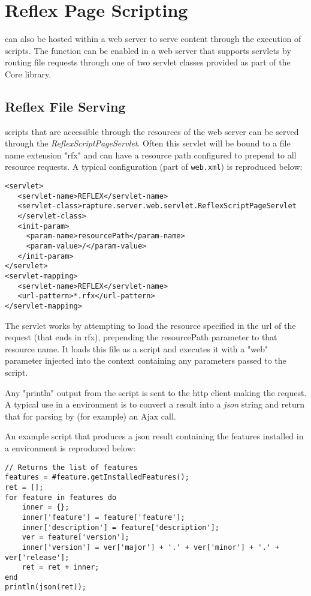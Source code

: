 \chapter{Reflex Page Scripting}
\Reflex can also be hosted within a web server to serve content through the execution of \Reflex scripts. The function can be enabled in a web server that supports servlets by routing file requests through one of two servlet classes provided as part of the \Rapture Core library.

\section{Reflex File Serving}
\Reflex scripts that are accessible through the resources of the web server can be served through the \emph{ReflexScriptPageServlet}. Often this servlet will be bound to a file name extension "rfx" and can have a resource path configured to prepend to all resource requests. A typical configuration (part of \Verb+web.xml+) is reproduced below:

\begin{Verbatim}
<servlet>
   <servlet-name>REFLEX</servlet-name>
   <servlet-class>rapture.server.web.servlet.ReflexScriptPageServlet
   </servlet-class>
   <init-param>
     <param-name>resourcePath</param-name>
     <param-value>/</param-value>
   </init-param>
</servlet>
<servlet-mapping>
   <servlet-name>REFLEX</servlet-name>
   <url-pattern>*.rfx</url-pattern>
</servlet-mapping>
\end{Verbatim}

The servlet works by attempting to load the resource specified in the url of the request (that ends in rfx), prepending the resourcePath parameter to that resource name. It loads this file as a \Reflex script and executes it with a "web" parameter injected into the context containing any parameters passed to the script.

Any "println" output from the script is sent to the http client making the request. A typical use in a \Rapture environment is to convert a result into a \emph{json} string and return that for parsing by (for example) an Ajax call.

An example script that produces a json result containing the features installed in a \Rapture environment is reproduced below:

\begin{lstlisting}[caption={Reflex Page Script Example}]
// Returns the list of features
features = #feature.getInstalledFeatures();
ret = [];
for feature in features do
    inner = {};
    inner['feature'] = feature['feature'];
    inner['description'] = feature['description'];
    ver = feature['version'];
    inner['version'] = ver['major'] + '.' + ver['minor'] + '.' + ver['release'];
    ret = ret + inner;
end
println(json(ret));
\end{lstlisting}

